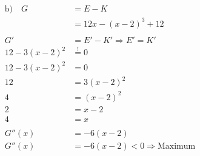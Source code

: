 \begin{align*}
	\text{b)}\quad G & = E - K                                  \\
	                 & = 12x - {(x-2)}^3 + 12                   \\
	\\
	G'               & = E'-K' \Rightarrow E' = K'              \\
	12 - 3{(x-2)}^2  & \overset{!}{=} 0                         \\
	12 - 3{(x-2)}^2  & = 0                                      \\
	12               & = 3{(x-2)}^2                             \\
	4                & = {(x-2)}^2                              \\
	2                & = x-2                                    \\
	4                & = x                                      \\
	\\
	G''(x)           & = -6(x-2)                                \\
	G''(x)           & = -6(x-2) < 0 \Rightarrow \text{Maximum}
\end{align*}
